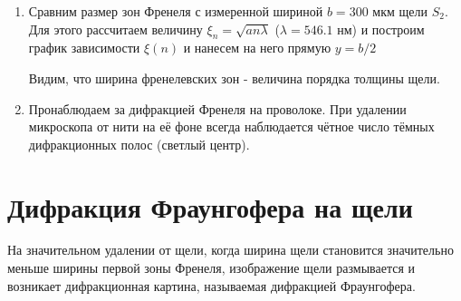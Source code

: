 \documentclass[a4paper]{article}
\begin{document}
\begin{enumerate}
\begin{table}[h]
\begin{tabular}{ |p{2.5cm}||p{0.5cm}|p{0.5cm}|p{0.5cm}|p{0.5cm}|p{0.5cm}|p{0.5cm}|p{0.5cm}|p{0.5cm}|}
\end{tabular}
\end{table}


\item Сравним размер зон Френеля с измеренной шириной $b = 300$ мкм щели $S_2$. Для этого рассчитаем величину $\xi_n=\sqrt{an\lambda}$ ($\lambda = 546.1$ нм) и построим график зависимости $\xi(n)$ и нанесем на него прямую $y = b/2$

\begin{center}
    \end{center}

Видим, что ширина френелевских зон - величина порядка толщины щели.

\item Пронаблюдаем за дифракцией Френеля на проволоке. При удалении микроскопа от нити на её фоне всегда наблюдается чётное число тёмных дифракционных полос (светлый центр).

\end{enumerate}

\section*{Дифракция Фраунгофера на щели}

На значительном удалении от щели, когда ширина щели становится значительно меньше ширины первой зоны Френеля, изображение щели размывается и возникает дифракционная картина, называемая дифракцией Фраунгофера.
\end{document}
